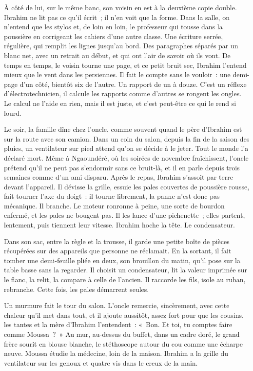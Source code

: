 \documentclass[10.5pt,twoside,openright]{book}
\begin{document}
À côté de lui, sur le même banc, son voisin en est à la deuxième copie double. Ibrahim ne lit pas ce qu’il écrit ; il n’en voit que la forme. Dans la salle, on n’entend que les stylos et, de loin en loin, le professeur qui tousse dans la poussière en corrigeant les cahiers d’une autre classe. Une écriture serrée, régulière, qui remplit les lignes jusqu’au bord. Des paragraphes séparés par un blanc net, avec un retrait au début, et qui ont l’air de savoir où ils vont. De temps en temps, le voisin tourne une page, et ce petit bruit sec, Ibrahim l’entend mieux que le vent dans les persiennes. Il fait le compte sans le vouloir : une demi-page d’un côté, bientôt six de l’autre. Un rapport de un à douze. C’est un réflexe d’électrotechnicien, il calcule les rapports comme d’autres se rongent les ongles. Le calcul ne l’aide en rien, mais il est juste, et c’est peut-être ce qui le rend si lourd.

Le soir, la famille dîne chez l’oncle, comme souvent quand le père d’Ibrahim est sur la route avec son camion. Dans un coin du salon, depuis la fin de la saison des pluies, un ventilateur sur pied attend qu’on se décide à le jeter. Tout le monde l’a déclaré mort. Même à Ngaoundéré, où les soirées de novembre fraîchissent, l’oncle prétend qu’il ne peut pas s’endormir sans ce bruit-là, et il en parle depuis trois semaines comme d’un ami disparu. Après le repas, Ibrahim s’assoit par terre devant l’appareil. Il dévisse la grille, essuie les pales couvertes de poussière rousse, fait tourner l’axe du doigt : il tourne librement, la panne n’est donc pas mécanique. Il branche. Le moteur ronronne à peine, une sorte de bourdon enfermé, et les pales ne bougent pas. Il les lance d’une pichenette ; elles partent, lentement, puis tiennent leur vitesse. Ibrahim hoche la tête. Le condensateur.

Dans son sac, entre la règle et la trousse, il garde une petite boîte de pièces récupérées sur des appareils que personne ne réclamait. En la sortant, il fait tomber une demi-feuille pliée en deux, son brouillon du matin, qu’il pose sur la table basse sans la regarder. Il choisit un condensateur, lit la valeur imprimée sur le flanc, la relit, la compare à celle de l’ancien. Il raccorde les fils, isole au ruban, rebranche. Cette fois, les pales démarrent seules.

Un murmure fait le tour du salon. L’oncle remercie, sincèrement, avec cette chaleur qu’il met dans tout, et il ajoute aussitôt, assez fort pour que les cousins, les tantes et la mère d’Ibrahim l’entendent : « Bon. Et toi, tu comptes faire comme Moussa ? » Au mur, au-dessus du buffet, dans un cadre doré, le grand frère sourit en blouse blanche, le stéthoscope autour du cou comme une écharpe neuve. Moussa étudie la médecine, loin de la maison. Ibrahim a la grille du ventilateur sur les genoux et quatre vis dans le creux de la main.
\end{document}
